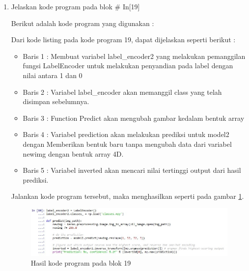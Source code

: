 \begin{enumerate}
\item Jelaskan kode program pada blok \# In[19]
	\par Berikut adalah kode program yang digunakan :
	
	\par Dari kode listing pada kode program 19, dapat dijelaskan seperti berikut :
	\begin{itemize}
	\item Baris 1	: Membuat variabel label\_encoder2 yang melakukan pemanggilan fungsi LabelEncoder untuk melakukan penyandian pada label dengan nilai antara 1 dan 0
	\item Baris 2	: Variabel label\_encoder akan memanggil class yang telah disimpan sebelumnya.
	\item Baris 3	: Function Predict akan mengubah gambar kedalam bentuk array
	\item Baris 4	: Variabel prediction akan melakukan prediksi untuk model2 dengan Memberikan bentuk baru tanpa mengubah data dari variabel newimg dengan bentuk array 4D.
	\item Baris 5	: Variabel inverted akan mencari nilai tertinggi output dari hasil prediksi.
	\end{itemize}
	\par Jalankan kode program tersebut, maka menghasilkan seperti pada gambar \ref{andri19}.
		\begin{figure}[!hbtp]
		\centering
		\includegraphics[scale=0.5]{figures/chapter7/andri19.jpg}
		\caption{Hasil kode program pada blok 19}
		\label{andri19}
		\end{figure}
		

\end{enumerate}
